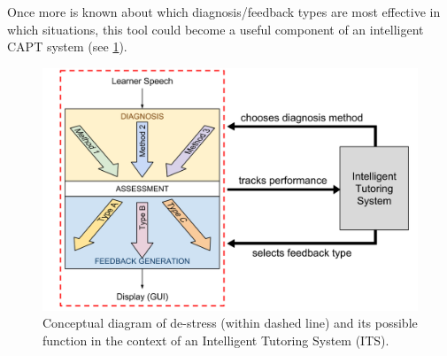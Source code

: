\documentclass[a0,portrait]{a0poster}
\newcommand{\headingcolor}{\color{BannerSixColor}}
\def\Highlight#1{{\sffamily \headingcolor #1}}
\begin{document}
\begin{textblock}{7}
  

Once more is known about which diagnosis/feedback types are most effective in which situations, this tool could become a useful component of an intelligent CAPT system (see \cref{fig:hourglass-ITS}).



\vspace{1em}

	\begin{figure}
	\centering
	\includegraphics[width=\textwidth]{hourglass-slate}
	\caption{Conceptual diagram of \Highlight{de-stress} (within dashed line) and its possible function in the context of an Intelligent Tutoring System (ITS).}
	\label{fig:hourglass-ITS}
	\end{figure}
 
\end{textblock}
\end{document}
